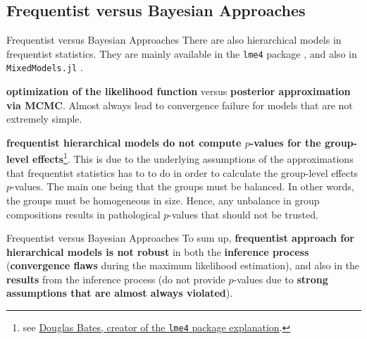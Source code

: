 \subsection{Frequentist versus Bayesian Approaches}
\begin{frame}{Frequentist versus Bayesian Approaches}
	There are also hierarchical models in frequentist statistics.
	They are mainly available in the \texttt{lme4} package \parencite{lme4},
	and also in \texttt{MixedModels.jl} \parencite{MixedModels}.
	\begin{vfilleditems}
		\item \textbf{optimization of the likelihood function} versus \textbf{posterior approximation via MCMC}.
		Almost always lead to convergence failure for models that are not extremely simple.
		\item \textbf{frequentist hierarchical models do not compute $p$-values for the group-level effects}\footnote{
			see \href{https://stat.ethz.ch/pipermail/r-help/2006-May/094765.html}
			{Douglas Bates, creator of the \texttt{lme4} package explanation}.}.
		This is due to the underlying assumptions of the approximations that frequentist
		statistics has to to do in order to calculate the group-level effects $p$-values.
		The main one being that the groups must be balanced.
		In other words, the groups must be homogeneous in size.
		Hence, any unbalance in group compositions results in pathological $p$-values
		that should not be trusted.
	\end{vfilleditems}
\end{frame}

\begin{frame}{Frequentist versus Bayesian Approaches}
	To sum up, \textbf{frequentist approach for hierarchical models is not robust}
	in both the \textbf{inference process}
	(\textbf{convergence flaws} during the maximum likelihood estimation),
	and also in the \textbf{results} from the inference process
	(do not provide $p$-values due to
	\textbf{strong assumptions that are almost always violated}).
\end{frame}

